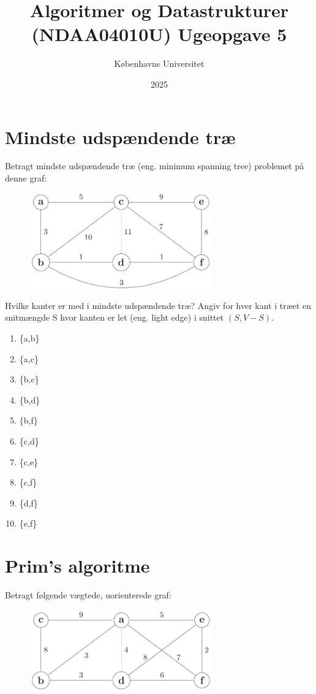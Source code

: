 \documentclass[12pt,a4paper]{article}
\title{Algoritmer og Datastrukturer (NDAA04010U) Ugeopgave 5}
\author{Københavns Universitet}
\date{2025}
\begin{document}
\maketitle

\section{Mindste udspændende træ}

Betragt mindste udspændende træ (eng. minimum spanning tree) problemet på denne graf:

\begin{figure}[h]
    \centering
    \includegraphics[width=0.7\textwidth]{Ugeopgave_5_markdown/Ugeopgave_5/_page_0_Figure_5.jpeg}
\end{figure}

Hvilke kanter er med i mindste udspændende træ? Angiv for hver kant i træet en snitmængde S hvor kanten er let (eng. light edge) i snittet $(S, V - S)$.

\begin{enumerate}
    \item \{a,b\}
    \item \{a,c\}
    \item \{b,c\}
    \item \{b,d\}
    \item \{b,f\}
    \item \{c,d\}
    \item \{c,e\}
    \item \{c,f\}
    \item \{d,f\}
    \item \{e,f\}
\end{enumerate}

\section{Prim's algoritme}

Betragt følgende vægtede, uorienterede graf:

\begin{figure}[h]
    \centering
    \includegraphics[width=0.7\textwidth]{Ugeopgave_5_markdown/Ugeopgave_5/_page_1_Figure_4.jpeg}
\end{figure}
\end{document}
